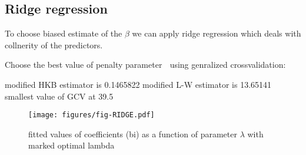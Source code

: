 \documentclass[a4paper]{article}
\begin{document}
\subsection{Ridge regression}
To choose biased estimate of the $\beta$ we can apply ridge regression which
deals with collnerity of the predictors.


Choose the best value of penalty parameter  using genralized crossvalidation:
\begin{Schunk}
\begin{Soutput}
modified HKB estimator is 0.1465822 
modified L-W estimator is 13.65141 
smallest value of GCV  at 39.5 
\end{Soutput}
\end{Schunk}

\begin{figure}[H]
\begin{center}
\advance\rightskip-0.5cm
\advance\leftskip-1cm
\texttt{[image: figures/fig-RIDGE.pdf]}
\caption{fitted values of coefficients (bi) as a function of parameter $\lambda$
with marked optimal lambda}
\end{center}
\end{figure}
\end{document}
